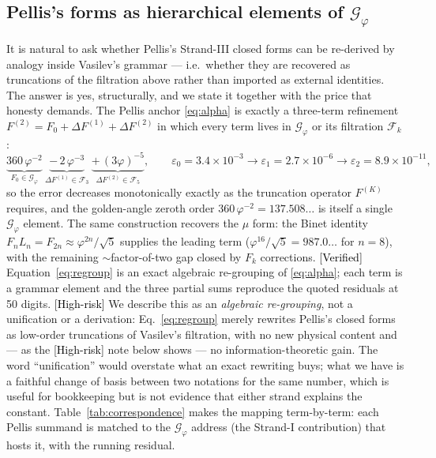 \documentclass[11pt]{article}
\newcommand{\Verified}{\textcolor{black}{[Verified]}}
\newcommand{\Risk}{\textcolor{black}{[High-risk]}}
\newcommand{\phigr}{\varphi}
\begin{document}
\subsection{Pellis's forms as hierarchical elements of $\mathcal{G}_{\phigr}$}\label{sec:pellis-map}
It is natural to ask whether Pellis's Strand-III closed forms can be re-derived by analogy inside Vasilev's grammar --- i.e.\ whether they are recovered as truncations of the filtration above rather than imported as external identities. The answer is yes, structurally, and we state it together with the price that honesty demands. The Pellis anchor \eqref{eq:alpha} is exactly a three-term refinement $F^{(2)} = F_0 + \Delta F^{(1)} + \Delta F^{(2)}$ in which every term lives in $\mathcal{G}_{\phigr}$ or its filtration $\mathcal{F}_k$:
\begin{equation}
\underbrace{360\,\phigr^{-2}}_{F_0 \in \mathcal{G}_{\phigr}}\ \underbrace{-\,2\,\phigr^{-3}}_{\Delta F^{(1)} \in \mathcal{F}_3}\ \underbrace{+\,(3\phigr)^{-5}}_{\Delta F^{(2)} \in \mathcal{F}_5}, \qquad \varepsilon_0 = 3.4{\times}10^{-3} \to \varepsilon_1 = 2.7{\times}10^{-6} \to \varepsilon_2 = 8.9{\times}10^{-11}, \label{eq:regroup}
\end{equation}
so the error decreases monotonically exactly as the truncation operator $F^{(K)}$ requires, and the golden-angle zeroth order $360\,\phigr^{-2} = 137.508\dots$ is itself a single $\mathcal{G}_{\phigr}$ element. The same construction recovers the $\mu$ form: the Binet identity $F_n L_n = F_{2n} \approx \phigr^{2n}/\sqrt{5}$ supplies the leading term ($\phigr^{16}/\sqrt{5} = 987.0\dots$ for $n = 8$), with the remaining $\sim$factor-of-two gap closed by $F_k$ corrections. \Verified{} Equation~\eqref{eq:regroup} is an exact algebraic re-grouping of \eqref{eq:alpha}; each term is a grammar element and the three partial sums reproduce the quoted residuals at 50 digits. \Risk{} We describe this as an \emph{algebraic re-grouping}, not a unification or a derivation: Eq.~\eqref{eq:regroup} merely rewrites Pellis's closed forms as low-order truncations of Vasilev's filtration, with no new physical content and --- as the \Risk{} note below shows --- no information-theoretic gain. The word ``unification'' would overstate what an exact rewriting buys; what we have is a faithful change of basis between two notations for the same number, which is useful for bookkeeping but is not evidence that either strand explains the constant. Table~\ref{tab:correspondence} makes the mapping term-by-term: each Pellis summand is matched to the $\mathcal{G}_{\phigr}$ address (the Strand-I contribution) that hosts it, with the running residual.
\end{document}
